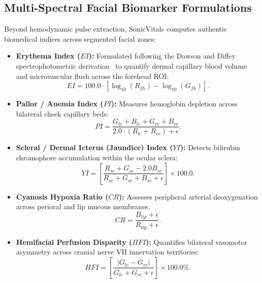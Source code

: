 \documentclass[journal]{IEEEtran}
\begin{document}
\subsection{Multi-Spectral Facial Biomarker Formulations}

Beyond hemodynamic pulse extraction, SonicVitals computes authentic biomedical indices across segmented facial zones:
\begin{itemize}
    \item \textbf{Erythema Index ($EI$):} Formulated following the Dawson and Diffey spectrophotometric derivation~\cite{ref19} to quantify dermal capillary blood volume and microvascular flush across the forehead ROI:
    \begin{equation}
        EI = 100.0 \cdot \left[ \log_{10}(R_{fh}) - \log_{10}(G_{fh}) \right].
        \label{eq:ei}
    \end{equation}
    \item \textbf{Pallor / Anemia Index ($PI$):} Measures hemoglobin depletion across bilateral cheek capillary beds:
    \begin{equation}
        PI = \frac{G_{lc} + B_{lc} + G_{rc} + B_{rc}}{2.0 \cdot (R_{lc} + R_{rc}) + \epsilon}.
        \label{eq:pi}
    \end{equation}
    \item \textbf{Scleral / Dermal Icterus (Jaundice) Index ($YI$):} Detects bilirubin chromophore accumulation within the ocular sclera:
    \begin{equation}
        YI = \left[ \frac{R_{sc} + G_{sc} - 2.0 B_{sc}}{R_{sc} + G_{sc} + B_{sc} + \epsilon} \right] \times 100.0.
        \label{eq:yi}
    \end{equation}
    \item \textbf{Cyanosis Hypoxia Ratio ($CR$):} Assesses peripheral arterial deoxygenation across perioral and lip mucous membranes:
    \begin{equation}
        CR = \frac{B_{lip} + \epsilon}{R_{lip} + \epsilon}.
        \label{eq:cr}
    \end{equation}
    \item \textbf{Hemifacial Perfusion Disparity ($HFI$):} Quantifies bilateral vasomotor asymmetry across cranial nerve VII innervation territories:
    \begin{equation}
        HFI = \left[ \frac{|G_{lc} - G_{rc}|}{G_{lc} + G_{rc} + \epsilon} \right] \times 100.0\%.
        \label{eq:hfi}
    \end{equation}
\end{itemize}
\end{document}
